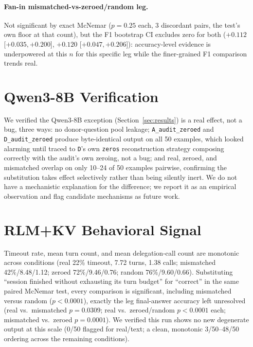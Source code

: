\documentclass[11pt]{article}
\begin{document}
\paragraph{Fan-in mismatched-vs-zeroed/random leg.} Not significant by
exact McNemar ($p=0.25$ each, 3 discordant pairs, the test's own floor
at that count), but the F1 bootstrap CI excludes zero for both
($+0.112$ [$+0.035,+0.200$], $+0.120$ [$+0.047,+0.206$]):
accuracy-level evidence is underpowered at this $n$ for this specific
leg while the finer-grained F1 comparison trends real.

\section{Qwen3-8B Verification}
\label{app:qwen3}

We verified the Qwen3-8B exception (Section~\ref{sec:results}) is a
real effect, not a bug, three ways: no donor-question pool leakage;
\texttt{A\_audit\_zeroed} and \texttt{D\_audit\_zeroed} produce
byte-identical output on all 50 examples, which looked alarming until
traced to \texttt{D}'s own \texttt{zeros} reconstruction strategy
composing correctly with the audit's own zeroing, not a bug; and real,
zeroed, and mismatched overlap on only 10--24 of 50 examples pairwise,
confirming the substitution takes effect selectively rather than being
silently inert. We do not have a mechanistic explanation for the
difference; we report it as an empirical observation and flag candidate
mechanisms as future work.

\section{RLM+KV Behavioral Signal}
\label{app:behavioral}

Timeout rate, mean turn count, and mean delegation-call count are
monotonic across conditions (real 22\% timeout, 7.72 turns, 1.38 calls;
mismatched 42\%/8.48/1.12; zeroed 72\%/9.46/0.76; random 76\%/9.60/0.66).
Substituting ``session finished without exhausting its turn budget''
for ``correct'' in the same paired McNemar test, every comparison is
significant, including mismatched versus random ($p<0.0001$), exactly
the leg final-answer accuracy left unresolved (real vs.\ mismatched
$p=0.0309$; real vs.\ zeroed/random $p<0.0001$ each; mismatched vs.\
zeroed $p=0.0001$). We verified this run shows no new degenerate output
at this scale (0/50 flagged for real/text; a clean, monotonic
3/50--48/50 ordering across the remaining conditions).
\end{document}
